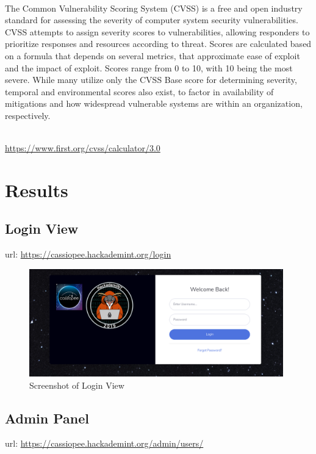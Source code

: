 \vspace{1cm}

\\
The Common Vulnerability Scoring System (CVSS) is a free and open industry standard for assessing the severity of computer system security vulnerabilities. CVSS attempts to assign severity scores to vulnerabilities, allowing responders to prioritize responses and resources according to threat. Scores are calculated based on a formula that depends on several metrics, that approximate ease of exploit and the impact of exploit. Scores range from 0 to 10, with 10 being the most severe. While many utilize only the CVSS Base score for determining severity, temporal and environmental scores also exist, to factor in availability of mitigations and how widespread vulnerable systems are within an organization, respectively.

\\
\vspace{0.2cm}
\url{https://www.first.org/cvss/calculator/3.0}

\pagebreak

\section{Results}

\subsection{Login View}
url: \url{https://cassiopee.hackademint.org/login}

\begin{figure}[!h]
  \centering
  \includegraphics[width=0.98\textwidth]{images/flask-application-01.png}
  \caption{Screenshot of Login View}
  \label{LoginView}
\end{figure}


\subsection{Admin Panel}
url: \url{https://cassiopee.hackademint.org/admin/users/}


